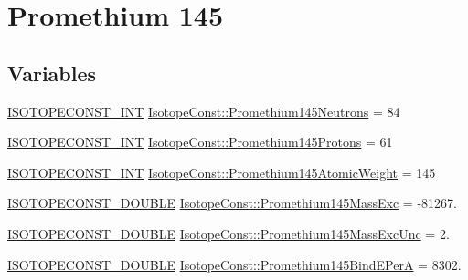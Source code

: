 \hypertarget{group___isotope_const-_promethium-_pm145}{}\section{Promethium 145}
\label{group___isotope_const-_promethium-_pm145}
\subsection*{Variables}
\begin{DoxyCompactItemize}
\item 
\mbox{\hyperlink{group___isotope_const-_macros_ga5f18360b3e99483a35c32d789e62621c}{I\+S\+O\+T\+O\+P\+E\+C\+O\+N\+S\+T\+\_\+\+I\+NT}} \mbox{\hyperlink{group___isotope_const-_promethium-_pm145_ga9b6aaa5389d61708e6cccdf51c4ce839}{Isotope\+Const\+::\+Promethium145\+Neutrons}} = 84
\item 
\mbox{\hyperlink{group___isotope_const-_macros_ga5f18360b3e99483a35c32d789e62621c}{I\+S\+O\+T\+O\+P\+E\+C\+O\+N\+S\+T\+\_\+\+I\+NT}} \mbox{\hyperlink{group___isotope_const-_promethium-_pm145_ga9ad5c4342ee4c6bae7d90e12e13d7315}{Isotope\+Const\+::\+Promethium145\+Protons}} = 61
\item 
\mbox{\hyperlink{group___isotope_const-_macros_ga5f18360b3e99483a35c32d789e62621c}{I\+S\+O\+T\+O\+P\+E\+C\+O\+N\+S\+T\+\_\+\+I\+NT}} \mbox{\hyperlink{group___isotope_const-_promethium-_pm145_gab04605c93155d68004fd6fe077827809}{Isotope\+Const\+::\+Promethium145\+Atomic\+Weight}} = 145
\item 
\mbox{\hyperlink{group___isotope_const-_macros_ga8f45a7272ce02c0b4c65c44636ed719a}{I\+S\+O\+T\+O\+P\+E\+C\+O\+N\+S\+T\+\_\+\+D\+O\+U\+B\+LE}} \mbox{\hyperlink{group___isotope_const-_promethium-_pm145_ga827dedf455170c89a35afbd924ec6eee}{Isotope\+Const\+::\+Promethium145\+Mass\+Exc}} = -\/81267.
\item 
\mbox{\hyperlink{group___isotope_const-_macros_ga8f45a7272ce02c0b4c65c44636ed719a}{I\+S\+O\+T\+O\+P\+E\+C\+O\+N\+S\+T\+\_\+\+D\+O\+U\+B\+LE}} \mbox{\hyperlink{group___isotope_const-_promethium-_pm145_ga201cca0e77cc9b01ff04882e71ce76b4}{Isotope\+Const\+::\+Promethium145\+Mass\+Exc\+Unc}} = 2.
\item 
\mbox{\hyperlink{group___isotope_const-_macros_ga8f45a7272ce02c0b4c65c44636ed719a}{I\+S\+O\+T\+O\+P\+E\+C\+O\+N\+S\+T\+\_\+\+D\+O\+U\+B\+LE}} \mbox{\hyperlink{group___isotope_const-_promethium-_pm145_gad0077c56c5d3e702bbec2e17698006ac}{Isotope\+Const\+::\+Promethium145\+Bind\+E\+PerA}} = 8302.

\end{DoxyCompactItemize}
